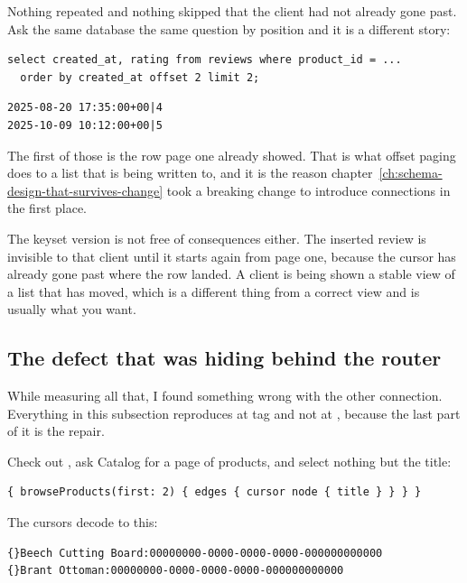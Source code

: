 Nothing repeated and nothing skipped that the client had not already gone past.
Ask the same database the same question by position and it is a different story:

\begin{verbatim}
select created_at, rating from reviews where product_id = ...
  order by created_at offset 2 limit 2;
\end{verbatim}

\begin{verbatim}
2025-08-20 17:35:00+00|4
2025-10-09 10:12:00+00|5
\end{verbatim}

The first of those is the row page one already showed. That is what offset
paging does to a list that is being written to, and it is the reason
chapter~\ref{ch:schema-design-that-survives-change} took a breaking change to
introduce connections in the first place.

The keyset version is not free of consequences either. The inserted review is
invisible to that client until it starts again from page one, because the cursor
has already gone past where the row landed. A client is being shown a stable
view of a list that has moved, which is a different thing from a correct view
and is usually what you want.

\subsection*{The defect that was hiding behind the router}

%
While measuring all that, I found something wrong with the other connection.
Everything in this subsection reproduces at tag  and not at
, because the last part of it is the repair.

Check out , ask Catalog for a page of products, and select nothing
but the title:

\begin{verbatim}
{ browseProducts(first: 2) { edges { cursor node { title } } } }
\end{verbatim}

The cursors decode to this:

\begin{verbatim}
{}Beech Cutting Board:00000000-0000-0000-0000-000000000000
{}Brant Ottoman:00000000-0000-0000-0000-000000000000
\end{verbatim}


